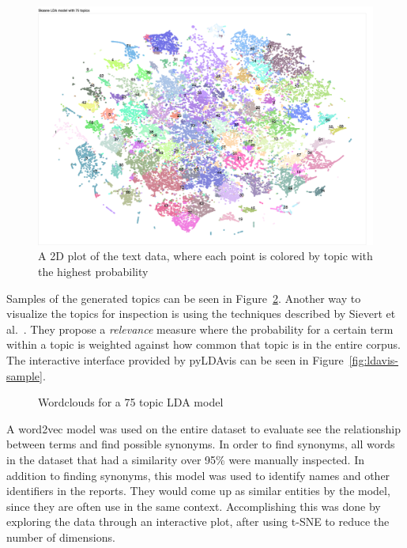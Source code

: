 \begin{figure}
    \centering
    \includegraphics[width=\textwidth]{figures/lda-2d-distribution.png}
    \caption{A 2D plot of the text data, where each point is colored by topic with the highest probability}
    \label{fig:lda-dist}
\end{figure}

Samples of the generated topics can be seen in Figure~\ref{fig:topic-wordclouds}.
Another way to visualize the topics for inspection is using the techniques described by Sievert et al\@.~\cite{sievert2014ldavis}.
They propose a \textit{relevance} measure where the probability for a certain term within a topic is weighted against how common that topic is in the entire corpus.
The interactive interface provided by pyLDAvis can be seen in Figure~\ref{fig:ldavis-sample}.

\begin{figure}
    \centering
    \caption{Wordclouds for a 75 topic LDA model}
    \label{fig:topic-wordclouds}
\end{figure}

A word2vec model was used on the entire dataset to evaluate see the relationship between terms and find possible synonyms.
In order to find synonyms, all words in the dataset that had a similarity over 95\% were manually inspected.
In addition to finding synonyms, this model was used to identify names and other identifiers in the reports.
They would come up as similar entities by the model, since they are often use in the same context.
Accomplishing this was done by exploring the data through an interactive plot, after using t-SNE to reduce the number of dimensions.

